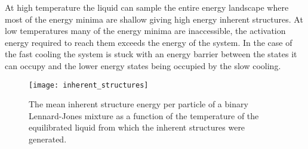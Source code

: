 At high temperature the liquid can sample the entire energy landscape where most of the energy minima are shallow giving high energy inherent structures. At low temperatures many of the energy minima are inaccessible, the activation energy required to reach them exceeds the energy of the system. In the case of the fast cooling the system is stuck with an energy barrier between the states it can occupy and the lower energy states being occupied by the slow cooling.

\begin{figure}
    \centering
    \texttt{[image: inherent\_structures]}
    \caption[The mean inherent structure energy as a function of temperature]{The mean inherent structure energy per particle of a binary Lennard-Jones mixture as a function of the temperature of the equilibrated liquid from which the inherent structures were generated.}
    \label{fig:inherent structures}
\end{figure}

